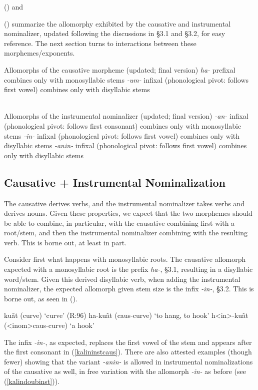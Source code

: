 \documentclass[output=paper,colorlinks,citecolor=brown,
]{langscibook}
\newcounter{nexttmp}    %
\newcounter{nnexttmp}   %
\newcommand{\Next}{\setcounter{nexttmp}{\value{equation}}\stepcounter{nexttmp}(\thenexttmp)\xspace}
\newcommand{\NNext}{\setcounter{nnexttmp}{\value{equation}}\addtocounter{nnexttmp}{2}(\thennexttmp)\xspace}
\begin{document}
\Next and \NNext summarize the allomorphy exhibited by the causative and instrumental nominalizer, updated following the discussions in \S3.1 and \S3.2, for easy reference. The next section turns to interactions between these morphemes/exponents.

\ea Allomorphs of the causative morpheme (updated; final version) \label{kalincausallos2}
\ea \textit{ha-}
\ea  prefixal
\ex combines only with monosyllabic stems
\z
\ex \textit{-um-} \label{kalincausallosb2}
\ea infixal (phonological pivot: follows first vowel)
\ex combines only with disyllabic stems\\~\\
\z
\z
\z

\ea Allomorphs of the instrumental nominalizer (updated; final version)  \label{kalininstallos2}
\ea \textit{-an-} \label{kalininstallosb2}
\ea  infixal (phonological pivot: follows first consonant)
\ex combines only with monosyllabic stems
\z
\ex \textit{-in-} \label{kalininstallosa2}
\ea infixal (phonological pivot: follows first vowel)
\ex combines only with disyllabic stems
\z
\ex \textit{-anin-} \label{kalininstallosc2}
\ea infixal (phonological pivot: follows first vowel)
\ex combines only with disyllabic stems
\z
\z
\z

\subsection{Causative + Instrumental Nominalization}

The causative derives verbs, and the instrumental nominalizer takes verbs and derives nouns. Given these properties, we expect that the two morphemes should be able to combine, in particular, with the causative combining first with a root/stem, and then the instrumental nominalizer combining with the resulting verb. This is borne out, at least in part. 

Consider first what happens with monosyllabic roots. The causative allomorph expected with a monosyllabic root is the prefix \textit{ha-}, \S3.1, resulting in a disyllabic word/stem. Given this derived disyllabic verb, when adding the instrumental nominalizer, the expected allomorph given stem size is the infix \textit{-in-}, \S3.2. This is borne out, as seen in \Next.

\ea 
\ea ku\~at (curve) \hfill `curve'  (R:96)
\ex ha-ku\~at ({\sc caus-}curve) \hfill `to hang, to hook'
\ex\label{kalininstcaus} h<in>-ku\~at ({\sc <inom>caus-}curve) \hfill `a hook'
\z
\z

\noindent The infix \textit{-in-}, as expected, replaces the first vowel of the stem and appears after the first consonant in (\ref{kalininstcaus}). There are also attested examples (though fewer) showing that the variant \textit{-anin-} is allowed in instrumental nominalizations of the causative as well, in free variation with the allomorph \textit{-in-} as before (see (\ref{kalindoubinst})).
\end{document}
